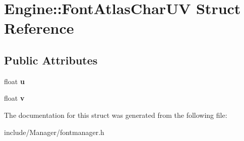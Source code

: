 \hypertarget{structEngine_1_1FontAtlasCharUV}{}\section{Engine\+:\+:Font\+Atlas\+Char\+U\+V Struct Reference}
\label{structEngine_1_1FontAtlasCharUV}
\subsection*{Public Attributes}
\begin{DoxyCompactItemize}
\item 
\hypertarget{structEngine_1_1FontAtlasCharUV_afb2b957046364571bb49636afe953501}{}float {\bfseries u}\label{structEngine_1_1FontAtlasCharUV_afb2b957046364571bb49636afe953501}

\item 
\hypertarget{structEngine_1_1FontAtlasCharUV_a7eee14e444af1f7fc0f49008347f764d}{}float {\bfseries v}\label{structEngine_1_1FontAtlasCharUV_a7eee14e444af1f7fc0f49008347f764d}

\end{DoxyCompactItemize}


The documentation for this struct was generated from the following file\+:\begin{DoxyCompactItemize}
\item 
include/\+Manager/fontmanager.\+h\end{DoxyCompactItemize}
